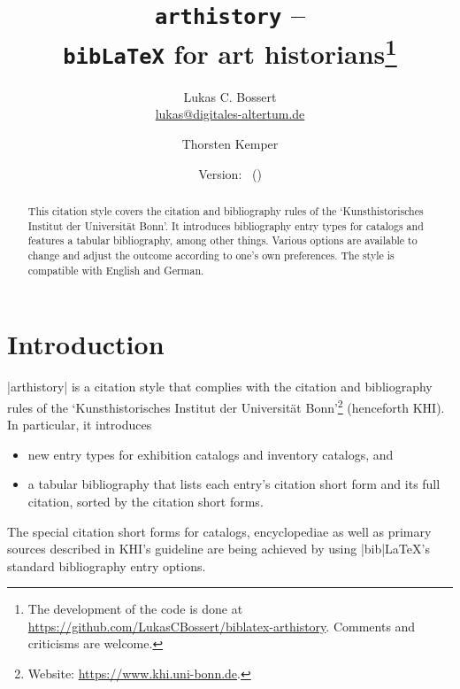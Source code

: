 \documentclass[a4paper,
10pt,
ngerman,
english
]{ltxdoc}
\begin{document}
\title{\texttt{arthistory} -- \\\texttt{bib\LaTeX} for art historians\footnote{The development of the code is done at \url{https://github.com/LukasCBossert/biblatex-arthistory}. 
Comments and criticisms are welcome.}}

\author{Lukas C. Bossert\protect\\%
{\small \href{mailto:lukas@digitales-altertum.de}{lukas@digitales-altertum.de}}
 \and Thorsten Kemper}
 
\date{Version: \arthistoryversion\ (\arthistorydate)
} 
\maketitle
 
 \begin{abstract}
\noindent This citation style covers the citation and bibliography rules of the \enquote*{Kunsthistorisches Institut der Universität Bonn}.
It introduces bibliography entry types for catalogs and features a tabular bibliography, among other things.
Various options are available to change and adjust the outcome according to one's own preferences. 
The style is compatible with English and German.
 \end{abstract}


\begin{multicols}{2}
\footnotesize\parskip=0mm \tableofcontents
\end{multicols}

\section{Introduction}
|arthistory| is a citation style that complies with the citation and bibliography rules of the \enquote*{Kunsthistorisches Institut der Universität Bonn}\footnote{Website: \url{https://www.khi.uni-bonn.de}.} (henceforth KHI). In particular, it introduces
\begin{itemize}
	\item new entry types for exhibition catalogs and inventory catalogs, and
	\item a tabular bibliography that lists each entry's citation short form and its full citation, sorted by the citation short forms.
\end{itemize}
The special citation short forms for catalogs, encyclopediae as well as primary sources described in KHI's guideline are being achieved by using |bib|\LaTeX{}'s standard bibliography entry options.
\end{document}
